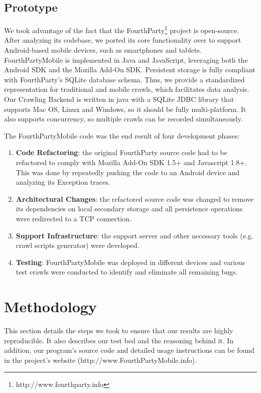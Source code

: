 \documentclass{acm_proc_article-sp}
\begin{document}
\subsection{Prototype}
We took advantage of the fact that the FourthParty\footnote{http://www.fourthparty.info} project is open-source. After analyzing its codebase, we ported its core functionality over to support Android-based mobile devices, such as smartphones and tablets. FourthPartyMobile is implemented in Java and JavaScript, leveraging both the Android SDK and the Mozilla Add-On SDK. Persistent storage is fully compliant with FourthParty's SQLite database schema. Thus, we provide a standardized representation for traditional and mobile crawls, which facilitates data analysis. Our Crawling Backend is written in java with a SQLite JDBC library that supports Mac OS, Linux and Windows, so it should be fully multi-platform. It also supports concurrency, so multiple crawls can be recorded simultaneously. 

The FourthPartyMobile code was the end result of four development phases:

\begin{enumerate}
\item \textbf{Code Refactoring}: the original FourthParty source code had to be refactored to comply with Mozilla Add-On SDK 1.5+ and Javascript 1.8+. This was done by repeatedly pushing the code to an Android device and analyzing its Exception traces.

\item \textbf{Architectural Changes}: the refactored source code was changed to remove its dependencies on local secondary storage and all persistence operations were redirected to a TCP connection.

\item \textbf{Support Infrastructure}: the support server and other necessary tools (e.g. crawl scripts generator) were developed.

\item \textbf{Testing}: FourthPartyMobile was deployed in different devices and various test crawls were conducted to identify and eliminate all remaining bugs.

\end{enumerate}

\section{Methodology}
This section details the steps we took to ensure that our results are highly reproducible. It also describes our test bed and the reasoning behind it. In addition, our program's source code and detailed usage instructions can be found in the project's website (http://www.FourthPartyMobile.info).
\end{document}
